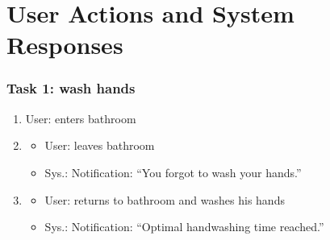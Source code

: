 \documentclass{beamer}
\begin{document}
\section{User Actions and System Responses}
\begin{frame}
  \frametitle{Task 1: wash hands}
  \begin{enumerate}
  \item User: enters bathroom

  \item  \begin{itemize}
    \item User: leaves bathroom
    \item Sys.: Notification: ``You forgot to wash your hands.''
    \end{itemize}

  \item  \begin{itemize}
    \item User: returns to bathroom and washes his hands
    \item Sys.: Notification: ``Optimal handwashing time reached.''
    \end{itemize}
  \end{enumerate}          
\end{frame}
\end{document}
